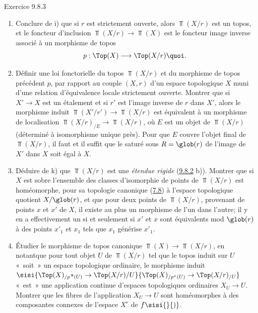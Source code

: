 \documentclass[10pt]{../fichiers-configuration-latex/smfart}
\begin{document}
\begin{enonce*}[remark]{Exercice 9.8.3}
\begin{enumerate}
\item Conclure de i) que si $r$ est strictement ouverte, alors
$\Top(X/r)$ est un topos, et le foncteur d'inclusion
$\Top(X/r)\rightarrow \Top(X)$ est le foncteur image inverse associé
à un morphisme de topos
$$
p:\Top(X)\longrightarrow \Top(X/r){\quoi}.
$$

\item Définir une loi fonctorielle du topos $\Top(X/r)$ et du
morphisme de topos précédent $p$, par rapport au couple $(X,r)$ d'un
espace topologique $X$ muni d'une relation d'équivalence locale
strictement ouverte. Montrer que si $X'\rightarrow X$ est un
étalement et si $r'$ est l'image inverse de $r$ dans $X'$, alors le
morphisme induit $\Top(X'/r')\rightarrow \Top(X/r)$ est équivalent à
un morphisme de localisation $\Top(X/r)_{/E}\rightarrow \Top(X/r)$,
où $E$ est un objet de $\Top(X/r)$ (déterminé à isomorphisme unique
près). Pour que $E$ couvre l'objet final de $\Top(X/r)$, il faut et
il suffit que le saturé sous $R=\glob(r)$ de l'image de $X'$ dans
$X$ soit égal à $X$.

\item Déduire de k) que $\Top(X/r)$ est une \emph{étendue rigide}
(\hyperref[IV.exer9.8.2]{9.8.2} b)). Montrer que si $X$ est sobre l'ensemble des
classes
     d'isomorphie de points de $\Top(X/r)$ est homéomorphe, pour sa
     topologie canonique (\hyperref[IV.exer7.8]{7.8}) à l'espace topologique quotient
     $X/\glob(r)$, et que pour deux points de $\Top(X/r)$, provenant
     de points $x$ et $x'$ de $X$, il existe au plus un morphisme de
     l'un dans l'autre; il y en a effectivement un si et seulement si
     $x'$ et $x$ sont équivalents mod $\glob(r)$ à des points $x'_1$
     et $x_1$ tels que $x_1$ générise $x'_1$.

\item Étudier le morphisme de topos canonique $\Top(X)\rightarrow
     \Top(X/r)$, en notant\pageoriginale que pour tout objet $U$ de
     $\Top(X/r)$ tel que le topos induit sur $U$ « soit »  un
     espace topologique ordinaire, le morphisme induit
     $\sisi{\Top(X)_{/p}\ast_{(U)}\rightarrow \Top(X/r)/U}
     {\Top(X)_{/p^*(U)}\rightarrow \Top(X/r)_{/U}}$ « est »  une
     application continue d'espaces topologiques ordinaires
     $X_U\rightarrow U$. Montrer que les fibres de l'application
     $X_U\rightarrow U$ sont homéomorphes à des composantes connexes
     de l'espace $X^r$ de $f\sisi{}{)}$.


\end{enumerate}
\end{enonce*}
\end{document}
